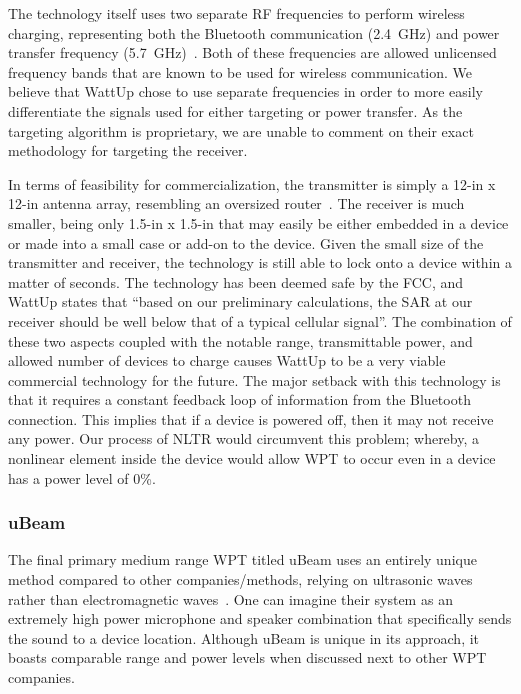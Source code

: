 The technology itself uses two separate RF frequencies to perform wireless charging, representing both the Bluetooth communication (2.4~GHz) and power transfer frequency (5.7~GHz)~\cite{energouscorporation2016}. Both of these frequencies are allowed unlicensed frequency bands that are known to be used for wireless communication. We believe that WattUp chose to use separate frequencies in order to more easily differentiate the signals used for either targeting or power transfer. As the targeting algorithm is proprietary, we are unable to comment on their exact methodology for targeting the receiver.

In terms of feasibility for commercialization, the transmitter is simply a 12-in x 12-in antenna array, resembling an oversized router~\cite{energouscorporation2016}. The receiver is much smaller, being only 1.5-in x 1.5-in that may easily be either embedded in a device or made into a small case or add-on to the device. Given the small size of the transmitter and receiver, the technology is still able to lock onto a device within a matter of seconds. The technology has been deemed safe by the FCC, and WattUp states that ``based on our preliminary calculations, the SAR at our receiver should be well below that of a typical cellular signal''. The combination of these two aspects coupled with the notable range, transmittable power, and allowed number of devices to charge causes WattUp to be a very viable commercial technology for the future. The major setback with this technology is that it requires a constant feedback loop of information from the Bluetooth connection. This implies that if a device is powered off, then it may not receive any power. Our process of NLTR would circumvent this problem; whereby, a nonlinear element inside the device would allow WPT to occur even in a device has a power level of 0\%.

\subsubsection{uBeam}
The final primary medium range WPT titled uBeam uses an entirely unique method compared to other companies/methods, relying on ultrasonic waves rather than electromagnetic waves~\cite{ubeam2016}. One can imagine their system as an extremely high power microphone and speaker combination that specifically sends the sound to a device location. Although uBeam is unique in its approach, it boasts comparable range and power levels when discussed next to other WPT companies.


